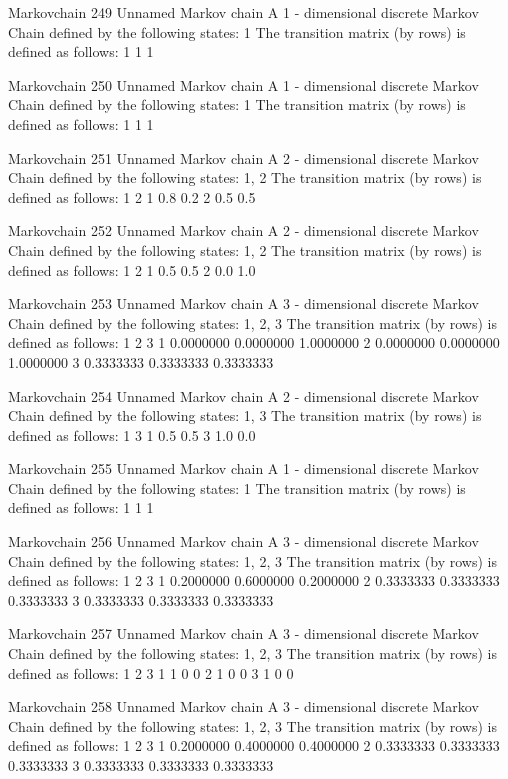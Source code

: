 \documentclass[
  nojss]{jss}
\begin{document}
\begin{CodeChunk}
\begin{CodeOutput}
Markovchain  249 
Unnamed Markov chain 
 A  1 - dimensional discrete Markov Chain defined by the following states: 
 1 
 The transition matrix  (by rows)  is defined as follows: 
  1
1 1

Markovchain  250 
Unnamed Markov chain 
 A  1 - dimensional discrete Markov Chain defined by the following states: 
 1 
 The transition matrix  (by rows)  is defined as follows: 
  1
1 1

Markovchain  251 
Unnamed Markov chain 
 A  2 - dimensional discrete Markov Chain defined by the following states: 
 1, 2 
 The transition matrix  (by rows)  is defined as follows: 
    1   2
1 0.8 0.2
2 0.5 0.5

Markovchain  252 
Unnamed Markov chain 
 A  2 - dimensional discrete Markov Chain defined by the following states: 
 1, 2 
 The transition matrix  (by rows)  is defined as follows: 
    1   2
1 0.5 0.5
2 0.0 1.0

Markovchain  253 
Unnamed Markov chain 
 A  3 - dimensional discrete Markov Chain defined by the following states: 
 1, 2, 3 
 The transition matrix  (by rows)  is defined as follows: 
          1         2         3
1 0.0000000 0.0000000 1.0000000
2 0.0000000 0.0000000 1.0000000
3 0.3333333 0.3333333 0.3333333

Markovchain  254 
Unnamed Markov chain 
 A  2 - dimensional discrete Markov Chain defined by the following states: 
 1, 3 
 The transition matrix  (by rows)  is defined as follows: 
    1   3
1 0.5 0.5
3 1.0 0.0

Markovchain  255 
Unnamed Markov chain 
 A  1 - dimensional discrete Markov Chain defined by the following states: 
 1 
 The transition matrix  (by rows)  is defined as follows: 
  1
1 1

Markovchain  256 
Unnamed Markov chain 
 A  3 - dimensional discrete Markov Chain defined by the following states: 
 1, 2, 3 
 The transition matrix  (by rows)  is defined as follows: 
          1         2         3
1 0.2000000 0.6000000 0.2000000
2 0.3333333 0.3333333 0.3333333
3 0.3333333 0.3333333 0.3333333

Markovchain  257 
Unnamed Markov chain 
 A  3 - dimensional discrete Markov Chain defined by the following states: 
 1, 2, 3 
 The transition matrix  (by rows)  is defined as follows: 
  1 2 3
1 1 0 0
2 1 0 0
3 1 0 0

Markovchain  258 
Unnamed Markov chain 
 A  3 - dimensional discrete Markov Chain defined by the following states: 
 1, 2, 3 
 The transition matrix  (by rows)  is defined as follows: 
          1         2         3
1 0.2000000 0.4000000 0.4000000
2 0.3333333 0.3333333 0.3333333
3 0.3333333 0.3333333 0.3333333


\end{CodeOutput}
\end{CodeChunk}
\end{document}
